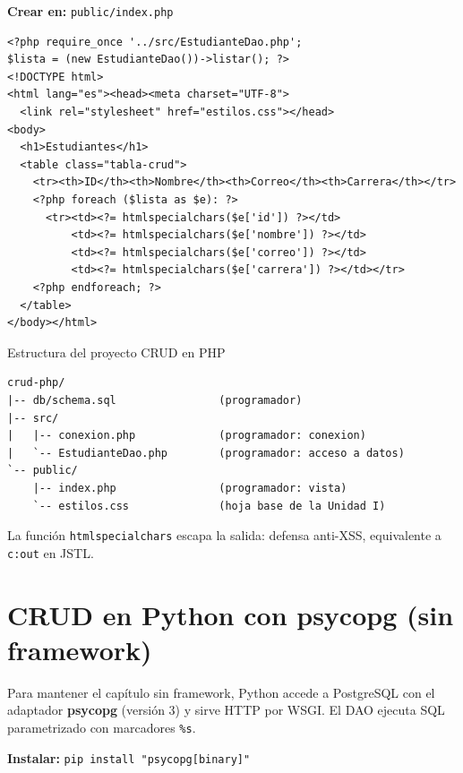 {\small\textbf{Crear en:} \texttt{public/index.php}}
\begin{lstlisting}[style=php,caption={index.php --- vista de listado},label={lst:c6-php-vista}]
<?php require_once '../src/EstudianteDao.php';
$lista = (new EstudianteDao())->listar(); ?>
<!DOCTYPE html>
<html lang="es"><head><meta charset="UTF-8">
  <link rel="stylesheet" href="estilos.css"></head>
<body>
  <h1>Estudiantes</h1>
  <table class="tabla-crud">
    <tr><th>ID</th><th>Nombre</th><th>Correo</th><th>Carrera</th></tr>
    <?php foreach ($lista as $e): ?>
      <tr><td><?= htmlspecialchars($e['id']) ?></td>
          <td><?= htmlspecialchars($e['nombre']) ?></td>
          <td><?= htmlspecialchars($e['correo']) ?></td>
          <td><?= htmlspecialchars($e['carrera']) ?></td></tr>
    <?php endforeach; ?>
  </table>
</body></html>
\end{lstlisting}

\begin{cajaejemplo}{Estructura del proyecto CRUD en PHP}
\begin{lstlisting}[style=shell,caption={Estructura del CRUD PHP},label={lst:c6-php-tree}]
crud-php/
|-- db/schema.sql                (programador)
|-- src/
|   |-- conexion.php             (programador: conexion)
|   `-- EstudianteDao.php        (programador: acceso a datos)
`-- public/
    |-- index.php                (programador: vista)
    `-- estilos.css              (hoja base de la Unidad I)
\end{lstlisting}
\end{cajaejemplo}

La función \texttt{htmlspecialchars} escapa la salida: defensa anti-XSS,
equivalente a \texttt{c:out} en JSTL.

\section{CRUD en Python con psycopg (sin framework)}
\label{sec:cap6:python}

Para mantener el capítulo sin framework, Python accede a PostgreSQL con
el adaptador \textbf{psycopg} (versión 3) y sirve HTTP por WSGI. El DAO
ejecuta SQL parametrizado con marcadores \texttt{\%s}.

{\small\textbf{Instalar:} \texttt{pip install "psycopg[binary]"}}

